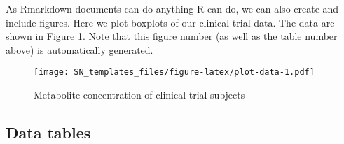 \documentclass[smallextended]{svjour3}       %
\begin{document}
As Rmarkdown documents can do anything R can do, we can also create and include figures. Here we plot boxplots of our clinical trial data. The data are shown in Figure \ref{fig:plot-data}. Note that this figure number (as well as the table number above) is automatically generated.

\begin{figure}
\centering
\texttt{[image: SN\_templates\_files/figure-latex/plot-data-1.pdf]}
\caption{\label{fig:plot-data}Metabolite concentration of clinical trial subjects}
\end{figure}

\hypertarget{sec:3}{%
\subsection{Data tables}\label{sec:3}}
\end{document}
